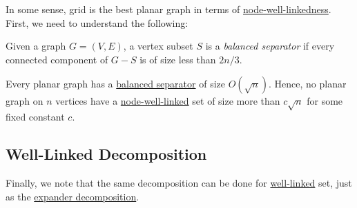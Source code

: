In some sense, grid is the best planar graph in terms of \hyperref[def:node-well-linked]{node-well-linkedness}. First, we need to understand the following:

\begin{definition}\label{def:balanced-separator}
	Given a graph \(G = (V, E)\), a vertex subset \(S\) is a \emph{balanced separator} if every connected component of \(G-S\) is of size less than \(2n / 3\).
\end{definition}

\begin{theorem}
	Every planar graph has a \hyperref[def:balanced-separator]{balanced separator} of size \(O(\sqrt{n} )\). Hence, no planar graph on \(n\) vertices have a \hyperref[def:node-well-linked]{node-well-linked} set of size more than \(c \sqrt{n} \) for some fixed constant \(c\).
\end{theorem}

\subsection{Well-Linked Decomposition}
Finally, we note that the same decomposition can be done for \hyperref[def:well-linked]{well-linked} set, just as the \hyperref[def:expander-decomposition]{expander decomposition}.